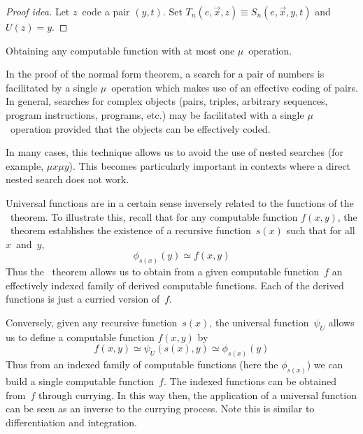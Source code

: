 \begin{proof}[Proof idea]
Let \(z\)~code a pair \((y,t)\). Set \(T_n(e,\vec{x},z)\equiv S_n(e,\vec{x},y,t)\) and \(U(z)=y\).
\end{proof}
\begin{app}
Obtaining any computable function with at most one \(\mu\)~operation.
\end{app}
\begin{rmk}
In the proof of the normal form theorem, a search for a pair of numbers is facilitated by a single \(\mu\)~operation which makes use of an effective coding of pairs. In general, searches for complex objects (pairs, triples, arbitrary sequences, program instructions, programs, etc.) may be facilitated with a single \(\mu\)~operation provided that the objects can be effectively coded.

In many cases, this technique allows us to avoid the use of nested searches (for example, \(\mu x\mu y\)). This becomes particularly important in contexts where a direct nested search does not work.
\end{rmk}
\begin{rmk}
Universal functions are in a certain sense inversely related to the functions of the \smn\ theorem. To illustrate this, recall that for any computable function \(f(x,y)\), the \smn\ theorem establishes the existence of a recursive function~\(s(x)\) such that for all \(x\)~and~\(y\),
\[\phi_{s(x)}(y)\simeq f(x,y)\]
Thus the \smn\ theorem allows us to obtain from a given computable function~\(f\) an effectively indexed family of derived computable functions. Each of the derived functions is just a curried version of~\(f\).

Conversely, given any recursive function~\(s(x)\), the universal function~\(\psi_U\) allows us to define a computable function \(f(x,y)\) by
\[f(x,y)\simeq\psi_U(s(x),y)\simeq\phi_{s(x)}(y)\]
Thus from an indexed family of computable functions (here the \(\phi_{s(x)}\)) we can build a single computable function~\(f\). The indexed functions can be obtained from~\(f\) through currying. In this way then, the application of a universal function can be seen as an inverse to the currying process. Note this is similar to differentiation and integration.
\end{rmk}
